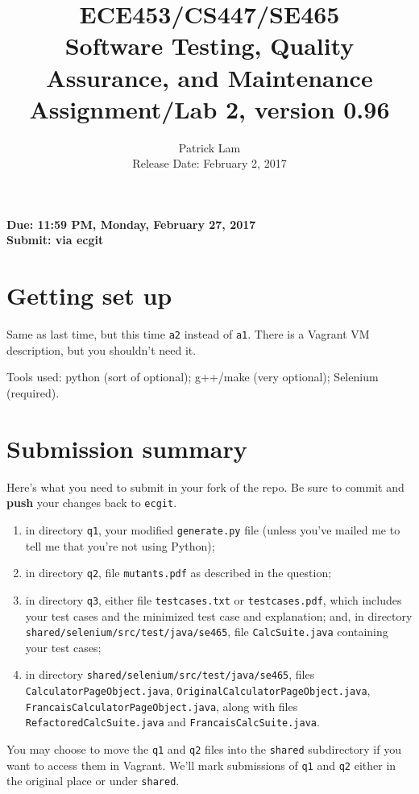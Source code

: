 \documentclass[10pt,hidelinks]{article}
\begin{document}
\title{
ECE453/CS447/SE465 \\
Software Testing, Quality Assurance, and Maintenance\\
Assignment/Lab 2, version 0.96}
\author{Patrick Lam \\
{Release Date:  February 2, 2017} \\
}
\renewcommand{\today}{}
\maketitle

\begin{center}

{\bf Due:  11:59 PM, Monday, February 27, 2017} \\
{\bf Submit: via ecgit }\\
\end{center}

\section*{Getting set up}
Same as last time, but this time {\tt a2} instead of {\tt a1}. There is a Vagrant VM description,
but you shouldn't need it.

Tools used: python (sort of optional); g++/make (very optional); Selenium (required).

\section*{Submission summary}
Here's what you need to submit in your fork of the repo. Be sure to commit
and {\bf push} your changes back to {\tt ecgit}.
\begin{enumerate}
\item in directory {\tt q1}, your modified {\tt generate.py} file (unless you've mailed me to tell me that you're not using Python);
\item in directory {\tt q2}, file {\tt mutants.pdf} as described in the question;
\item in directory {\tt q3}, either file {\tt testcases.txt} or {\tt testcases.pdf}, which includes your test cases and the minimized test case and explanation; and, in directory {\tt shared/selenium/src/test/java/se465}, file {\tt CalcSuite.java} containing your test cases;
\item in directory {\tt shared/selenium/src/test/java/se465}, files {\tt CalculatorPageObject.java}, {\tt OriginalCalculatorPageObject.java}, {\tt FrancaisCalculatorPageObject.java}, along with files {\tt RefactoredCalcSuite.java} and {\tt FrancaisCalcSuite.java}.
\end{enumerate}
You may choose to move the {\tt q1} and {\tt q2} files into the {\tt shared} subdirectory if you want to access them in Vagrant. We'll mark submissions of {\tt q1} and {\tt q2} either in the original place or under {\tt shared}.
 
\end{document}
